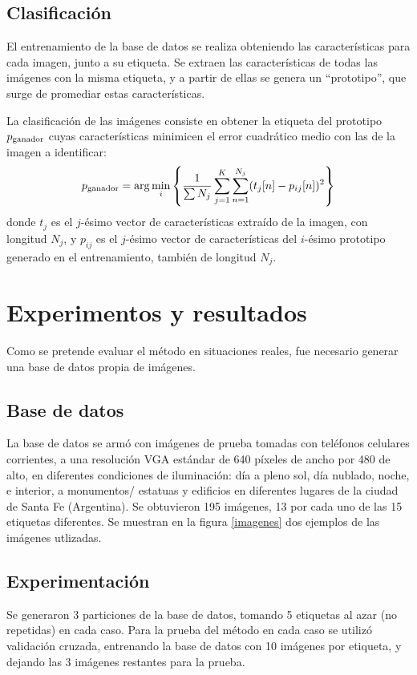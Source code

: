 \documentclass[conference,a4paper,10pt,oneside,final]{tfmpd}
\begin{document}
\subsection*{Clasificación}
El entrenamiento de la base de datos se realiza obteniendo las características
para cada imagen, junto a su etiqueta.
Se extraen las características de todas las imágenes
con la misma etiqueta, y a partir de ellas se genera un
``prototipo'', que surge de promediar estas características.

La clasificación de las imágenes consiste en
obtener la e\-ti\-que\-ta del prototipo $p_{\textrm{ganador}}$ cuyas características
minimicen el error cuadrático medio con las de la imagen a identificar:
\begin{equation}
  p_{\textrm{ganador}}=\arg \min_i\left\{ \frac{1}{\sum N_j}
                \sum_{j=1}^K\sum_{n=1}^{N_j}(t_j[n]-p_{ij}[n])^2\right\}
\end{equation}
donde $t_j$ es el $j$-ésimo vector de características extraído de la imagen, con
longitud $N_j$, y $p_{ij}$ es el $j$-ésimo vector de características del
$i$-ésimo prototipo generado en el entrenamiento, también de longitud $N_j$.
%
%
%
%
\section{Experimentos y resultados}
Como se pretende evaluar el método en situaciones reales, fue necesario generar
una base de datos propia de imágenes.
%
%
\subsection*{Base de datos}
La base de datos se armó con imágenes de prueba tomadas con teléfonos celulares
corrientes, a una resolución VGA estándar de 640 píxeles de ancho por 480 de
alto, en diferentes condiciones
de iluminación: día a pleno sol, día nublado, noche, e interior, a monumentos/%
estatuas y edificios en diferentes lugares de la ciudad de Santa Fe (Argentina).
{Se obtuvieron 195 imágenes, 13 por cada uno de las 15 etiquetas diferentes.}
Se muestran en la figura \ref{imagenes} dos ejemplos de las imágenes utlizadas.
%
%
\subsection*{Experimentación}
Se generaron 3 particiones de la base de datos, tomando
5 etiquetas al azar (no repetidas) en cada caso.
Para la prueba del método {en cada caso} se utilizó validación cruzada,
entrenando la base de datos con 10 imágenes por etiqueta, y dejando las 3
imágenes restantes para la prueba.
\end{document}

